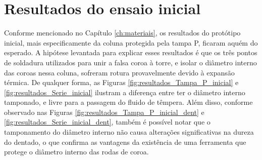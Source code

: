 \section{Resultados do ensaio inicial} \label{sec:resultados_ensaio_inicial}

Conforme mencionado no Capítulo \ref{ch:materiais}, os resultados do protótipo inicial, mais especificamente da coluna protegida pela tampa P, ficaram aquém do esperado. A hipótese levantada para explicar esses resultados é que os três pontos de soldadura utilizados para unir a falsa coroa à torre, e isolar o diâmetro interno das coroas nessa coluna, sofreram rotura provavelmente devido à expansão térmica. De qualquer forma, as Figuras \ref{fig:resultados_Tampa_P_inicial} e \ref{fig:resultados_Serie_inicial} ilustram a diferença entre ter o diâmetro interno tamponado, e livre para a passagem do fluido de têmpera. Além disso, conforme observado nas Figuras \ref{fig:resultados_Tampa_P_inicial_dent} e \ref{fig:resultados_Serie_inicial_dent}, também é possível notar que o tamponamento do diâmetro interno não causa alterações significativas na dureza do dentado, o que confirma as vantagens da existência de uma ferramenta que protege o diâmetro interno das rodas de coroa.
